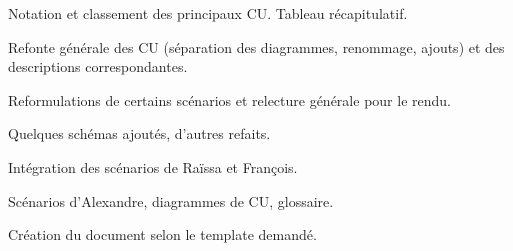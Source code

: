 
Notation et classement des principaux CU. Tableau récapitulatif.
\par
{}
Refonte générale des CU (séparation des diagrammes, renommage, ajouts) et des descriptions correspondantes.
\par
{}
Reformulations de certains scénarios et relecture générale pour le rendu.
\par
{}
Quelques schémas ajoutés, d'autres refaits.
\par
{}
Intégration des scénarios de Raïssa et François.
\par
{} 
Scénarios d'Alexandre, diagrammes de CU, glossaire.
\par
{} 
Création du document selon le template demandé.
\par
